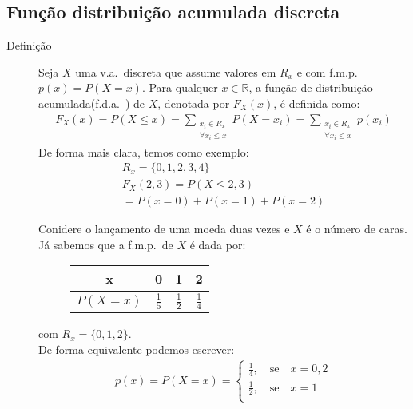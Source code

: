      \subsection{Função distribuição acumulada discreta}
     \begin{description}
       \item [Definição] Seja $X$ uma v.a.\ discreta que assume valores em $R_{x}$ e com f.m.p.\
         $p(x)=P(X=x)$. Para qualquer $x \in \mathbb{R}$, a função de distribuição 
         acumulada(f.d.a.\ ) de $X$, denotada por $F_{X}(x)$, é definida como: 
         \begin{align}
           F_{X}(x)=P(X \leq x )= \sum \limits_{\substack{x_{i} \in R_{x}\\ \forall x_i \le x}} P(X=x_i) = \sum \limits_{\substack{x_{i} \in R_{x}\\ \forall x_i \le x}} p(x_i) 
         \end{align}
         De forma mais clara, temos como exemplo: 
         \begin{align*}
           R_{x}= \{0,1,2,3,4 \}\\
           F_{X}(2,3)= P(X\le 2,3)\\
           = P(x=0)+P(x=1)+P(x=2)
         \end{align*}
         \begin{example}Conidere o lançamento de uma moeda duas vezes e $X$ é o número de caras. Já sabemos
           que a f.m.p.\ de $X$ é dada por:
           \begin{figure} [H]
             \centering
             \begin{tabular}{c c c c}
               \toprule
               x&0&1&2\\ \midrule
               $P(X=x)$&$\frac{1}{5}$&$\frac{1}{2}$&$\frac{1}{4}$\\ \bottomrule
             \end{tabular}
             \label{tab:5}
           \end{figure}
           com $R_{x}=\{0,1,2\}$.\\
           De forma equivalente podemos escrever: 
           \begin{align*}
             p(x)=P(X=x)=
             \begin{cases}
               \frac{1}{4}, \quad \text{se} \quad x=0,2\\
               \frac{1}{2}, \quad \text{se} \quad x=1\\

\end{cases}
\end{align*}
\end{example}
\end{description}
